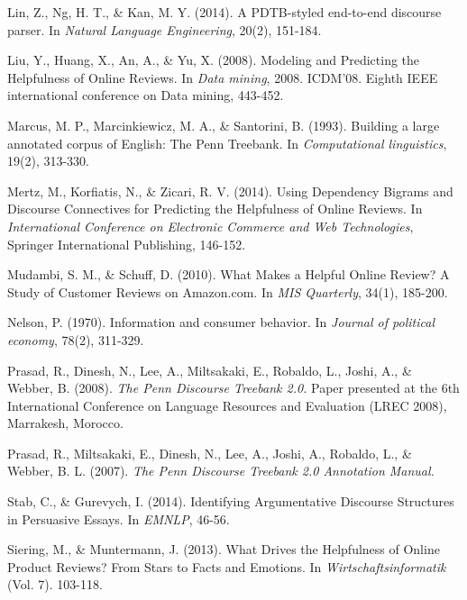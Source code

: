 \documentclass[
    a4paper,%
    12pt,%
    oneside,%
    toc=bibliography,
    final,
]{scrartcl}
\begin{document}
\begin{thebibliography}{9}
 Lin, Z., Ng, H. T., \& Kan, M. Y. (2014). A PDTB-styled end-to-end discourse parser. In \textit{Natural Language Engineering}, 20(2), 151-184.

 Liu, Y., Huang, X., An, A., \& Yu, X. (2008). Modeling and Predicting the Helpfulness of Online Reviews. In \textit{Data mining}, 2008. ICDM'08. Eighth IEEE international conference on Data mining, 443-452.

 Marcus, M. P., Marcinkiewicz, M. A., \& Santorini, B. (1993). Building a large annotated corpus of English: The Penn Treebank. In \textit{Computational linguistics}, 19(2), 313-330.

 Mertz, M., Korfiatis, N., \& Zicari, R. V. (2014). Using Dependency Bigrams and Discourse Connectives for Predicting the Helpfulness of Online Reviews. In \textit{International Conference on Electronic Commerce and Web Technologies}, Springer International Publishing, 146-152.

 Mudambi, S. M., \& Schuff, D. (2010). What Makes a Helpful Online Review? A Study of Customer Reviews on Amazon.com. In \textit{MIS Quarterly}, 34(1), 185-200.

 Nelson, P. (1970). Information and consumer behavior. In \textit{Journal of political economy}, 78(2), 311-329.

 Prasad, R., Dinesh, N., Lee, A., Miltsakaki, E., Robaldo, L., Joshi, A., \& Webber, B. (2008). \textit{The Penn Discourse Treebank 2.0.} Paper presented at the 6th International Conference on Language Resources and Evaluation (LREC 2008), Marrakesh, Morocco.

 Prasad, R., Miltsakaki, E., Dinesh, N., Lee, A., Joshi, A., Robaldo, L., \& Webber, B. L. (2007). \textit{The Penn Discourse Treebank 2.0 Annotation Manual.}

 Stab, C., \& Gurevych, I. (2014). Identifying Argumentative Discourse Structures in Persuasive Essays. In \textit{EMNLP}, 46-56.

 Siering, M., \& Muntermann, J. (2013). What Drives the Helpfulness of Online Product Reviews? From Stars to Facts and Emotions. In \textit{Wirtschaftsinformatik} (Vol. 7). 103-118.


\end{thebibliography}
\end{document}
